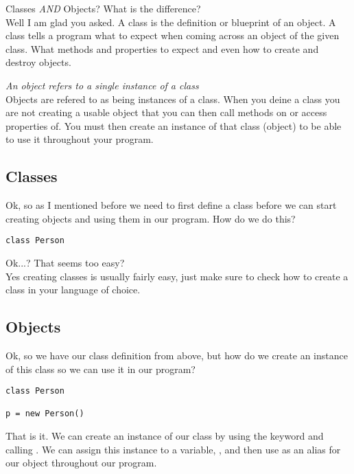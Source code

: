 Classes \emph{AND} Objects?
What is the difference?
\\

Well I am glad you asked.
A class is the definition or blueprint of an object.
A class tells a program what to expect when coming across an object of the given class.
What methods and properties to expect and even how to create and destroy objects.
\par

\emph{An object refers to a single instance of a class}
\\
Objects are refered to as being instances of a class.
When you deine a class you are not creating a usable object that you can then call methods on
or access properties of.
You must then create an instance of that class (object) to be able to use it throughout your program.

\subsection{Classes}
Ok, so as I mentioned before we need to first define a class before we can start creating objects 
and using them in our program.
How do we do this?
\par

\begin{lstlisting}[caption={Class Definition}]
class Person
\end{lstlisting}

Ok...?
That seems too easy?
\\
Yes creating classes is usually fairly easy, just make sure to check how to create a class in your language of choice.

\subsection{Objects}
Ok, so we have our class definition from above, but how do we create an instance of this class so we can use it in our program?
\par

\begin{lstlisting}[caption={Object Declaration}]
class Person

p = new Person()
\end{lstlisting}

That is it.
We can create an instance of our  class by using the  keyword and calling .
We can assign this instance to a variable, , and then use  as an alias for our object throughout
our program.
\par

